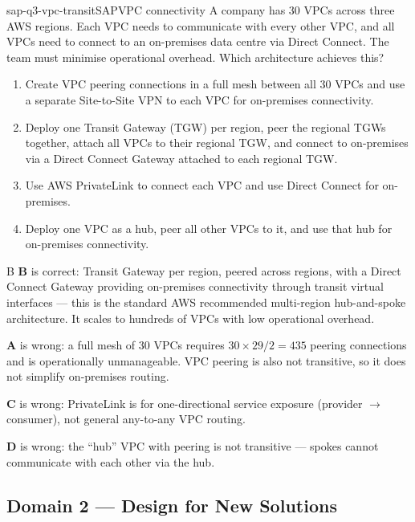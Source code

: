 \begin{question}{sap-q3-vpc-transit}{SAP}{VPC connectivity}
A company has 30 VPCs across three AWS regions. Each VPC needs to communicate with every other VPC, and all VPCs need to connect to an on-premises data centre via Direct Connect. The team must minimise operational overhead. Which architecture achieves this?

\begin{enumerate}[label=\Alph*.]
  \item Create VPC peering connections in a full mesh between all 30 VPCs and use a separate Site-to-Site VPN to each VPC for on-premises connectivity.
  \item Deploy one Transit Gateway (TGW) per region, peer the regional TGWs together, attach all VPCs to their regional TGW, and connect to on-premises via a Direct Connect Gateway attached to each regional TGW.
  \item Use AWS PrivateLink to connect each VPC and use Direct Connect for on-premises.
  \item Deploy one VPC as a hub, peer all other VPCs to it, and use that hub for on-premises connectivity.
\end{enumerate}
\end{question}

\begin{answer}{B}
\textbf{B} is correct: Transit Gateway per region, peered across regions, with a Direct Connect Gateway providing on-premises connectivity through transit virtual interfaces --- this is the standard AWS recommended multi-region hub-and-spoke architecture. It scales to hundreds of VPCs with low operational overhead.

\textbf{A} is wrong: a full mesh of 30 VPCs requires $30 \times 29 / 2 = 435$ peering connections and is operationally unmanageable. VPC peering is also not transitive, so it does not simplify on-premises routing.

\textbf{C} is wrong: PrivateLink is for one-directional service exposure (provider $\to$ consumer), not general any-to-any VPC routing.

\textbf{D} is wrong: the ``hub'' VPC with peering is not transitive --- spokes cannot communicate with each other via the hub.
\end{answer}


\subsection{Domain 2 --- Design for New Solutions}

